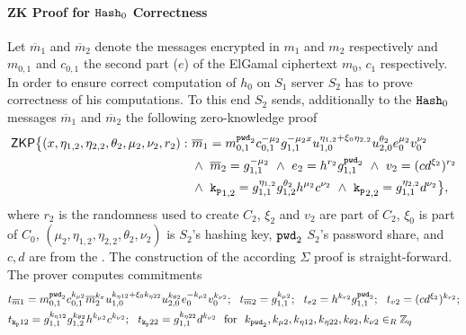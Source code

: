 \paragraph{ZK Proof for $\mathtt{Hash}_0$ Correctness}
Let $\overline{m}_1$ and $\overline{m}_2$ denote the messages encrypted in $m_1$ and $m_2$ respectively and $m_{0,1}$ and $c_{0,1}$ the second part ($e$) of the ElGamal ciphertext $m_0$, $c_1$ respectively.
In order to ensure correct computation of $h_0$ on $S_1$ server $S_2$ has to prove correctness of his computations.
To this end $S_2$ sends, additionally to the $\mathtt{Hash}_0$ messages $\overline{m}_1$ and $\overline{m}_2$ the following zero-knowledge proof 
\begin{equation}
\begin{split}
    \mathsf{ZKP}\big\{ (x, \eta_{1,2}, \eta_{2,2}, \theta_2, \mu_2, \nu_2, r_2): ~ &  
      \overline{m}_1 = m_{0,1}^{\mathtt{pwd}_2} c_{0,1}^{-\mu_2} g_{1,1}^{-\mu_2 x} u_{1,0}^{\eta_{1,2} + \xi_0 \eta_{2,2}} u_{2,0}^{\theta_2} e_0^{\mu_2} v_0^{\nu_2} \\
      & \wedge ~ \overline{m}_2 = g_{1,1}^{-\mu_2} ~ \wedge ~ e_2 = h^{r_2}g_{1,1}^{\mathtt{pwd}_2} ~ \wedge ~ v_2 = (cd^{\xi_2})^{r_2} \\
      & \wedge ~ \mathtt{k_p}_{1,2} = g_{1,1}^{\eta_{1,2}} g_{1,2}^{\theta_2} h^{\mu_2} c^{\nu_2} ~ \wedge ~ \mathtt{k_p}_{2,2} = g_{1,1}^{\eta_{2,2}} d^{\nu_2}
      \big\},
\end{split}
\end{equation}
where $r_2$ is the randomness used to create $C_2$, $\xi_2$ and $v_2$ are part of $C_2$, $\xi_0$ is part of $C_0$, $(\mu_2, \eta_{1,2}, \eta_{2,2}, \theta_2, \nu_2)$ is $S_2$'s hashing key, $\mathtt{pwd}_2$ $S_2$'s password share, and $c,d$ are from the \crs.
The construction of the according $\Sigma$ proof is straight-forward.
The prover computes commitments
\begin{align*}
  & t_{\overline{m}1} = m_{0,1}^{{\mathtt{pwd}_2}} c_{0,1}^{k_{\mu2}} \overline{m}_{2}^{k_{x}} u_{1,0}^{k_{\eta12} + \xi_0 k_{\eta22}} u_{2,0}^{k_{\theta2}} e_0^{-k_{\mu2}} v_0^{k_{\nu2}}; ~~
    t_{\overline{m}2} = g_{1,1}^{k_{\mu2}}; ~~  t_{e2} = h^{k_{r2}}g_{1,1}^{{\mathtt{pwd}_2}}; ~~ t_{v2} = (cd^{\xi_2})^{k_{r2}}; \\
  & t_{\mathtt{k_p}12} = g_{1,1}^{k_{\eta12}} g_{1,2}^{k_{\theta2}} h^{k_{\mu2}} c^{k_{\nu2}}; ~~ t_{\mathtt{k_p}22} = g_{1,1}^{k_{\eta22}} d^{k_{\nu2}}
    \text{ ~for~ } k_{\mathtt{pwd}_2}, k_{\mu2}, k_{\eta12}, k_{\eta22}, k_{\theta2}, k_{\nu2} \in_R \mathbb{Z}_q
\end{align*}
